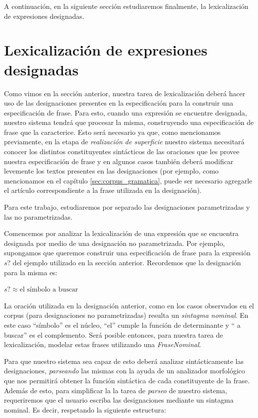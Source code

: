 A continuación, en la siguiente sección estudiaremos finalmente, la lexicalización de expresiones designadas.

\section{Lexicalización de expresiones designadas}
\label{sec:verbalizacion_designaciones}
Como vimos en la sección anterior, nuestra tarea de lexicalización deberá hacer uso de las designaciones presentes en la especificación para la construir una especificación de frase. Para esto, cuando una expresión se encuentre designada, nuestro sistema tendrá que procesar la misma, construyendo una especificación de frase que la caracterice. Esto será necesario ya que, como mencionamos previamente, en la etapa de \emph{realización de superficie} nuestro sistema necesitará conocer los distintos constituyentes sintácticos de las oraciones que les provee nuestra especificación de frase y en algunos casos también deberá modificar levemente los textos presentes en las designaciones (por ejemplo, como mencionamos en el capítulo \ref{sec:corpus_gramatica}, puede ser necesario agregarle el artículo correspondiente a la frase utilizada en la designación).

Para este trabajo, estudiaremos por separado las designaciones parametrizadas y las no parametrizadas.

Comencemos por analizar la lexicalización de una expresión que se encuentra designada por medio de una designación no parametrizada. Por ejemplo, supongamos que queremos construir una especificación de frase para la expresión $s?$ del ejemplo utilizado en la sección anterior. Recordemos que la designación para la misma es:

\begin{center} 
  $s? \approx \text{el símbolo a buscar}$ 
\end{center}

La oración utilizada en la designación anterior, como en los casos observados en el corpus (para designaciones no parametrizadas) resulta un \emph{sintagma nominal}. En este caso ``símbolo'' es el núcleo, ``el'' cumple la función de determinante y `` a buscar'' es el complemento. Será posible entonces, para nuestra tarea de lexicalización, modelar estas frases utilizando una \emph{FraseNominal}. 

Para que nuestro sistema sea capaz de esto deberá analizar sintácticamente las designaciones, \textit{parseando} las mismas con la ayuda de un analizador morfológico que nos permitirá obtener la función sintáctica de cada constituyente de la frase. Además de esto, para simplificar la la tarea de \emph{parseo} de nuestro sistema, requeriremos que el usuario escriba las designaciones mediante un sintagma nominal. Es decir, respetando la siguiente estructura:

